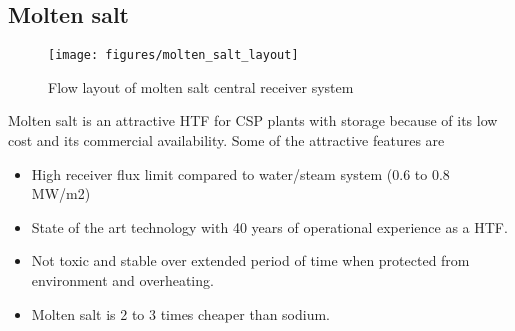 \subsection{Molten salt}
\begin{figure}[h!]
	\texttt{[image: figures/molten\_salt\_layout]}
	\centering
	\caption{Flow layout of molten salt central receiver system}
\end{figure}
Molten salt is an attractive HTF for CSP plants with storage because of its low cost and its commercial availability. Some of the attractive features are
\begin{itemize}
\item High receiver flux limit compared to water/steam system (0.6 to 0.8 MW/m2)
\item State of the art technology with 40 years of operational experience as a HTF. 
\item Not toxic and stable over extended period of time when protected from environment and overheating. 
\item Molten salt is 2 to 3 times cheaper than sodium.
\end{itemize}

